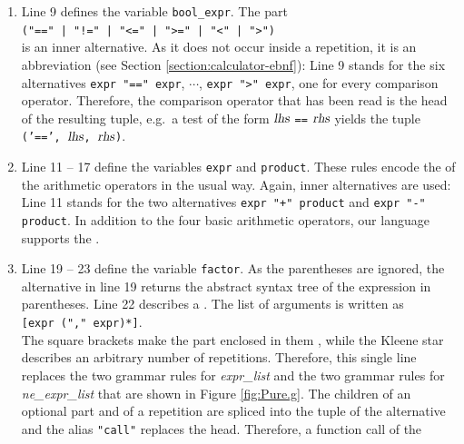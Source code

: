 \begin{enumerate}
      of the expression and we could not distinguish an expression statement from an expression.  The alias
      replaces the head, so an expression statement is represented as \texttt{('expr', $\textsl{expr}$)}.
      Note that an alias may be written with or without double quotes.
\item Line 9 defines the variable \texttt{bool\_expr}.  The part
      \\[0.2cm]
      \hspace*{1.3cm}
      \verb+("==" | "!=" | "<=" | ">=" | "<" | ">")+
      \\[0.2cm]
      is an inner alternative.  As it does not occur inside a repetition, it is an abbreviation (see
      Section \ref{section:calculator-ebnf}):  Line 9 stands for
      the six alternatives \texttt{expr "==" expr}, $\cdots$, \texttt{expr ">" expr}, one for every
      comparison operator.  Therefore, the comparison operator that has been read is the head of the
      resulting tuple, e.g.~a test of the form $\textsl{lhs}$ \texttt{==} $\textsl{rhs}$ yields the tuple
      \texttt{('==', $\textsl{lhs}$, $\textsl{rhs}$)}.
\item Line 11 -- 17 define the variables \texttt{expr} and \texttt{product}.  These rules encode the
       of the arithmetic operators in the usual way.  Again, inner alternatives are used:
      Line 11 stands for the two alternatives \texttt{expr "+" product} and \texttt{expr "-" product}.  In
      addition to the four basic arithmetic operators, our language supports the
       \squoted{\%}.
\item Line 19 -- 23 define the variable \texttt{factor}.  As the parentheses are ignored, the alternative in
      line 19 returns the abstract syntax tree of the expression in parentheses.  Line 22 describes a
      .  The list of arguments is written as
      \\[0.2cm]
      \hspace*{1.3cm}
      \texttt{[expr ("," expr)*]}.
      \\[0.2cm]
      The square brackets make the part enclosed in them , while the Kleene star describes an
      arbitrary number of repetitions.  Therefore, this single line replaces the two grammar rules for
      \textsl{expr\_list} and the two grammar rules for \textsl{ne\_expr\_list} that are shown in Figure
      \ref{fig:Pure.g}.  The children of an optional part and of a repetition are spliced into the tuple
      of the alternative and the alias \texttt{"call"} replaces the head.  Therefore, a function call of the

\end{enumerate}
